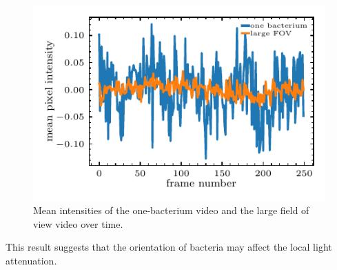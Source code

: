 \documentclass[onecolumn,aps, pre,amsmath,amssymb,longbibliography,11pt]{revtex4-2}
\begin{document}
\begin{figure}[h]
  \begin{center}
    \includegraphics[width=5in]{orientation-results.pdf}
  \end{center}
  \caption[]{Mean intensities of the one-bacterium video and the large field of view video over time.}
  \label{fig:results}
\end{figure}

This result suggests that the orientation of bacteria may affect the local light attenuation.
\end{document}
